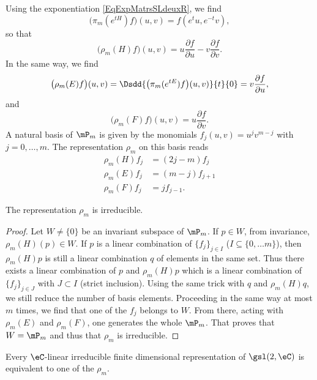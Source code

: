 Using the exponentiation \eqref{EqExpMatrsSLdeuxR}, we find
\[
    \big( \pi_m( e^{tH})f \big)(u,v)=f( e^{t}u, e^{-t}v),
\]
so that
\begin{equation}
    \big( \rho_m(H)f \big)(u,v)=u\frac{ \partial f }{ \partial u }-v\frac{ \partial f }{ \partial v }.
\end{equation}
In the same way, we find
\begin{equation}
    \big( \rho_m(E)f \big)(u,v)=\Dsdd{ \big( \pi_m( e^{tE})f \big)(u,v) }{t}{0}=v\frac{ \partial f }{ \partial u },
\end{equation}
and
\begin{equation}
     \big( \rho_m(F)f \big)(u,v)=u \frac{ \partial f }{ \partial v }.
\end{equation}
A natural basis of $\mP_m$ is given by the monomials $f_j(u,v)=u^jv^{m-j}$ with $j=0,\ldots,m$. The representation $\rho_m$ on this basis reads
\begin{equation}        \label{EqReprezgsldeuxC}
\begin{split}
    \rho_m(H)f_j&=(2j-m)f_j\\
    \rho_m(E)f_j&=(m-j)f_{j+1}\\
    \rho_m(F)f_j&=jf_{j-1}.
\end{split}
\end{equation}

\begin{proposition}     \label{ProprhomirredsldeuxC}
The representation $\rho_m$ is irreducible.
\end{proposition}

\begin{proof}
Let $W\neq\{ 0 \}$ be an invariant subspace of $\mP_m$. If $p\in W$, from invariance, $\rho_m(H)(p)\in W$. If $p$ is a linear combination of $\{ f_j \}_{j\in I}$ ($I\subseteq \{ 0,\ldots m \}$), then $\rho_m(H)p$ is still a linear combination $q$ of elements in the same set. Thus there exists a linear combination of $p$ and $\rho_m(H)p$ which is a linear combination of $\{ f_j \}_{j\in J}$ with $J\subset I$ (strict inclusion). Using the same trick with $q$ and $\rho_m(H)q$, we still reduce the number of basis elements. Proceeding in the same way at most $m$ times, we find that one of the $f_j$ belongs to $W$. From there, acting with $\rho_m(E)$ and $\rho_m(F)$, one generates the whole $\mP_m$. That proves that $W=\mP_m$ and thus that $\rho_m$ is irreducible.
\end{proof}

\begin{theorem}
Every $\eC$-linear irreducible finite dimensional representation of $\gsl(2,\eC)$ is equivalent to one of the $\rho_m$.
\end{theorem}

